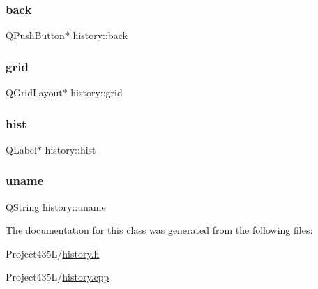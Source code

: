 \subsubsection{\texorpdfstring{back}{back}}
{\footnotesize\ttfamily Q\+Push\+Button$\ast$ history\+::back\hspace{0.3cm}{\ttfamily [private]}}

\mbox{\label{classhistory_a6b0377402a79bdffed3797bd0a220f61}} 
\subsubsection{\texorpdfstring{grid}{grid}}
{\footnotesize\ttfamily Q\+Grid\+Layout$\ast$ history\+::grid\hspace{0.3cm}{\ttfamily [private]}}

\mbox{\label{classhistory_a182b22fa21e4b592c0ddfb83419782dc}} 
\subsubsection{\texorpdfstring{hist}{hist}}
{\footnotesize\ttfamily Q\+Label$\ast$ history\+::hist\hspace{0.3cm}{\ttfamily [private]}}

\mbox{\label{classhistory_af60d04037f156f29a87c23f5ead85177}} 
\subsubsection{\texorpdfstring{uname}{uname}}
{\footnotesize\ttfamily Q\+String history\+::uname\hspace{0.3cm}{\ttfamily [private]}}



The documentation for this class was generated from the following files\+:\begin{DoxyCompactItemize}
\item 
Project435\+L/\hyperlink{history_8h}{history.\+h}\item 
Project435\+L/\hyperlink{history_8cpp}{history.\+cpp}\end{DoxyCompactItemize}
